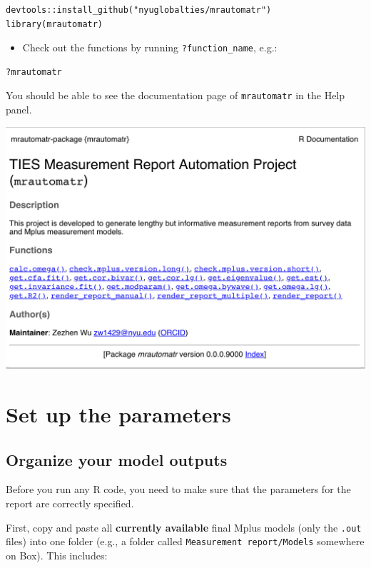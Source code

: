 \documentclass[
]{book}
\providecommand{\tightlist}{%
  \setlength{\itemsep}{0pt}\setlength{\parskip}{0pt}}
\begin{document}
\begin{verbatim}
devtools::install_github("nyuglobalties/mrautomatr")
library(mrautomatr)
\end{verbatim}

\begin{itemize}
\tightlist
\item
  Check out the functions by running \texttt{?function\_name}, e.g.:
\end{itemize}

\begin{verbatim}
?mrautomatr
\end{verbatim}

You should be able to see the documentation page of \texttt{mrautomatr} in the Help panel.

\begin{center}\includegraphics[width=0.66\linewidth]{images/mrautomatr_doc_page} \end{center}

\hypertarget{set-up-the-parameters}{%
\chapter{Set up the parameters}\label{set-up-the-parameters}}

\hypertarget{organize-your-model-outputs}{%
\section{Organize your model outputs}\label{organize-your-model-outputs}}

Before you run any R code, you need to make sure that the parameters for the report are correctly specified.

First, copy and paste all \textbf{currently available} final Mplus models (only the \texttt{.out} files) into one folder (e.g., a folder called \texttt{Measurement\ report/Models} somewhere on Box). This includes:
\end{document}
